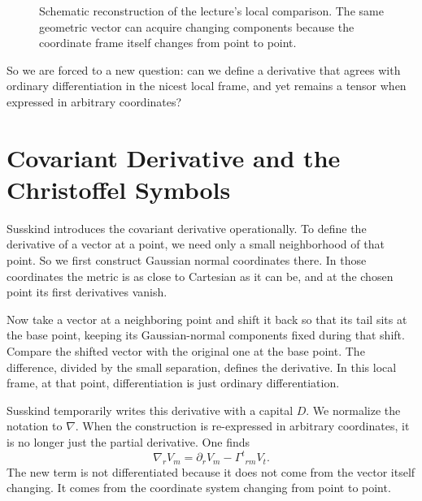 \begin{figure}[h]
\centering
{}
\caption{Schematic reconstruction of the lecture's local comparison. The same geometric vector can acquire changing components because the coordinate frame itself changes from point to point.}
\end{figure}

So we are forced to a new question: can we define a derivative that agrees with ordinary differentiation in the nicest local frame, and yet remains a tensor when expressed in arbitrary coordinates?

\section{Covariant Derivative and the Christoffel Symbols}

Susskind introduces the covariant derivative operationally. To define the derivative of a vector at a point, we need only a small neighborhood of that point. So we first construct Gaussian normal coordinates there. In those coordinates the metric is as close to Cartesian as it can be, and at the chosen point its first derivatives vanish.

Now take a vector at a neighboring point and shift it back so that its tail sits at the base point, keeping its Gaussian-normal components fixed during that shift. Compare the shifted vector with the original one at the base point. The difference, divided by the small separation, defines the derivative. In this local frame, at that point, differentiation is just ordinary differentiation.

Susskind temporarily writes this derivative with a capital \(D\). We normalize the notation to \(\nabla\). When the construction is re-expressed in arbitrary coordinates, it is no longer just the partial derivative. One finds
\begin{equation}
\nabla_r V_m=\partial_r V_m-\Gamma^{t}{}_{rm}V_t.
\end{equation}
The new term is not differentiated because it does not come from the vector itself changing. It comes from the coordinate system changing from point to point.

